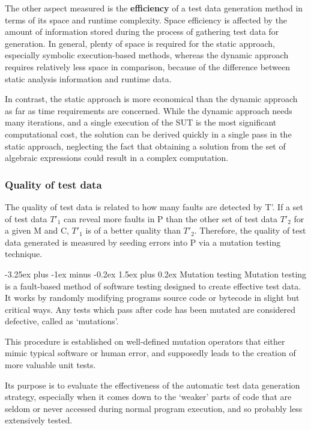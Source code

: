 \documentclass{icldt}
\makeatletter
\numberwithin{equation}{section}       %
\renewcommand{\paragraph}{\@startsection{paragraph}{4}{0ex}%
   {-3.25ex plus -1ex minus -0.2ex}%
   {1.5ex plus 0.2ex}%
   {\normalfont\normalsize\bfseries}}
\makeatother
\begin{document}
{The other aspect measured is the \textbf{efficiency} of a test data generation method in terms of its space and runtime complexity. Space efficiency is affected by the amount of information stored during the process of gathering test data for generation. In general, plenty of space is required for the static approach, especially symbolic execution-based methods, whereas the dynamic approach requires relatively less space in comparison, because of the difference between static analysis information and runtime data.

In contrast, the static approach is more economical than the dynamic approach as far as time requirements are concerned. While the dynamic approach needs many iterations, and a single execution of the SUT is the most significant computational cost, the solution can be derived quickly in a single pass in the static approach, neglecting the fact that obtaining a solution from the set of algebraic expressions could result in a complex computation.

\subsubsection{Quality of test data}
The quality of test data is related to how many faults are detected by T'. If a set of test data $T'_1$ can reveal more faults in P than the other set of test data $T'_2$ for a given M and C, $T'_1$ is of a better quality than $T'_2$. Therefore, the quality of test data generated is measured by seeding errors into P via a mutation testing technique.

\paragraph{Mutation testing}
Mutation testing is a fault-based method of software testing designed to create effective test data. It works by randomly modifying programs source code or bytecode in slight but critical ways. Any tests which pass after code has been mutated are considered defective, called as `mutations'.

This procedure is established on well-defined mutation operators that either mimic typical software or human error, and supposedly leads to the creation of more valuable unit tests.

Its purpose is to evaluate the effectiveness of the automatic test data generation strategy, especially when it comes down to the `weaker' parts of code that are seldom or never accessed during normal program execution, and so probably less extensively tested.

}
\end{document}
